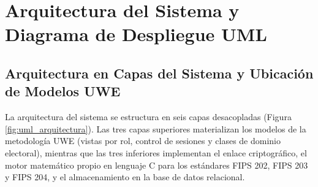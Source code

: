 \section{Arquitectura del Sistema y Diagrama de Despliegue UML}
\label{sec:arquitectura_sistema}

\subsection{Arquitectura en Capas del Sistema y Ubicación de Modelos UWE}

La arquitectura del sistema se estructura en seis capas desacopladas (Figura \ref{fig:uml_arquitectura}). Las tres capas superiores materializan los modelos de la metodología UWE (vistas por rol, control de sesiones y clases de dominio electoral), mientras que las tres inferiores implementan el enlace criptográfico, el motor matemático propio en lenguaje C para los estándares FIPS 202, FIPS 203 y FIPS 204, y el almacenamiento en la base de datos relacional.

